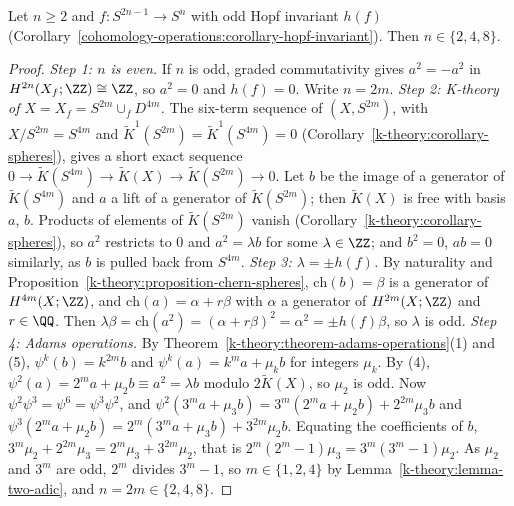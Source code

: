 \begin{theorem}[Adams]\label{k-theory:theorem-hopf-invariant-one}
Let $n \geq 2$ and $f \colon S^{2n-1} \to S^n$ with odd Hopf invariant $h(f)$ (Corollary~\ref{cohomology-operations:corollary-hopf-invariant}). Then $n \in \{2, 4, 8\}$.
\end{theorem}

\begin{proof}
\emph{Step 1: $n$ is even.} If $n$ is odd, graded commutativity gives $a^2 = -a^2$ in $H^{2n}(X_f; \ZZ) \cong \ZZ$, so $a^2 = 0$ and $h(f) = 0$. Write $n = 2m$.
\emph{Step 2: K-theory of $X = X_f = S^{2m} \cup_f D^{4m}$.} The six-term sequence of $(X, S^{2m})$, with $X/S^{2m} = S^{4m}$ and $\tilde{K}^1(S^{2m}) = \tilde{K}^1(S^{4m}) = 0$ (Corollary~\ref{k-theory:corollary-spheres}),
gives a short exact sequence $0 \to \tilde{K}(S^{4m}) \to \tilde{K}(X) \to \tilde{K}(S^{2m}) \to 0$. Let $b$ be the image of a generator of $\tilde{K}(S^{4m})$ and $a$ a lift of a generator of $\tilde{K}(S^{2m})$; then
$\tilde{K}(X)$ is free with basis $a$, $b$. Products of elements of $\tilde{K}(S^{2m})$ vanish (Corollary~\ref{k-theory:corollary-spheres}), so $a^2$ restricts to $0$ and $a^2 = \lambda b$ for some $\lambda \in \ZZ$;
and $b^2 = 0$, $ab = 0$ similarly, as $b$ is pulled back from $S^{4m}$.
\emph{Step 3: $\lambda = \pm h(f)$.} By naturality and Proposition~\ref{k-theory:proposition-chern-spheres}, $\mathrm{ch}(b) = \beta$ is a generator of $H^{4m}(X; \ZZ)$, and $\mathrm{ch}(a) = \alpha + r\beta$ with $\alpha$ a
generator of $H^{2m}(X; \ZZ)$ and $r \in \QQ$. Then $\lambda\beta = \mathrm{ch}(a^2) = (\alpha + r\beta)^2 = \alpha^2 = \pm h(f)\beta$, so $\lambda$ is odd.
\emph{Step 4: Adams operations.} By Theorem~\ref{k-theory:theorem-adams-operations}(1) and (5), $\psi^k(b) = k^{2m}b$ and $\psi^k(a) = k^ma + \mu_kb$ for integers $\mu_k$. By (4),
$\psi^2(a) = 2^ma + \mu_2b \equiv a^2 = \lambda b$ modulo $2\tilde{K}(X)$, so $\mu_2$ is odd. Now $\psi^2\psi^3 = \psi^6 = \psi^3\psi^2$, and $\psi^2(3^ma + \mu_3b) = 3^m(2^ma + \mu_2b) + 2^{2m}\mu_3b$ and $\psi^3(2^ma + \mu_2b) = 2^m(3^ma + \mu_3b) + 3^{2m}\mu_2b$. Equating the coefficients of $b$,
$3^m\mu_2 + 2^{2m}\mu_3 = 2^m\mu_3 + 3^{2m}\mu_2$, that is $2^m(2^m - 1)\mu_3 = 3^m(3^m - 1)\mu_2$. As $\mu_2$ and $3^m$ are odd, $2^m$ divides $3^m - 1$, so $m \in \{1, 2, 4\}$ by
Lemma~\ref{k-theory:lemma-two-adic}, and $n = 2m \in \{2, 4, 8\}$.
\end{proof}

